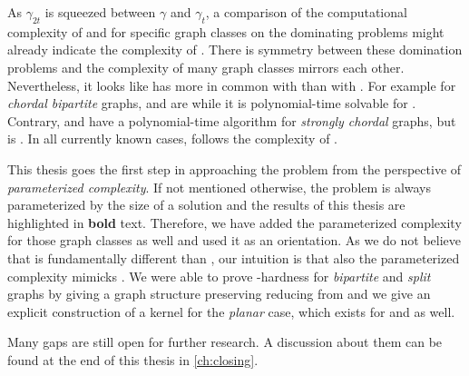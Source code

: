 As $\gamma_{2t}$ is squeezed between $\gamma$ and $\gamma_t$, a comparison of the computational complexity of \sdom and \tdom for specific graph classes on the dominating problems might already indicate the complexity of \sdoms.
There is symmetry between these domination problems and the complexity of many graph classes mirrors each other.
Nevertheless, it looks like \sdoms has more in common with \doms than with \tdoms.
For example for \textit{chordal bipartite} graphs, \sdoms and \doms are \NPc while it is polynomial-time solvable for \tdoms. 
Contrary, \sdoms and \doms have a polynomial-time algorithm for \textit{strongly chordal} graphs, but \tdoms is \NPc.
In all currently known cases, \sdom follows the complexity of \dom.

This thesis goes the first step in approaching the problem from the perspective of \textit{parameterized complexity}.
If not mentioned otherwise, the problem is always parameterized by the size of a solution and the results of this thesis are highlighted in \textbf{bold} text.
Therefore, we have added the parameterized complexity for those graph classes as well and used it as an orientation.
As we do not believe that \sdoms is fundamentally different than \doms, our intuition is that also the parameterized complexity mimicks \sdoms. 
We were able to prove \WTWO-hardness for \textit{bipartite} and \textit{split} graphs by giving a graph structure preserving reducing from \doms and we give an explicit construction of a kernel for the \textit{planar} case, which exists for \doms \cite{Alber2004} and \tdoms \cite{Garnero2019} as well.

Many gaps are still open for further research.
A discussion about them can be found at the end of this thesis in \cref{ch:closing}.

